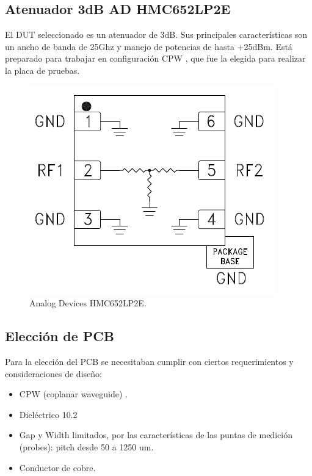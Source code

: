 \documentclass[10pt, a4paper, twocolumn]{article}
\begin{document}

\subsection{Atenuador 3dB AD HMC652LP2E}

El DUT seleccionado es un atenuador de 3dB. Sus principales características son
un ancho de banda de 25Ghz y manejo de potencias de hasta +25dBm. Está preparado
para trabajar en configuración CPW \cite{cpw}, que fue la elegida para realizar la placa de
pruebas.

\begin{figure}[hbt!]
	\includegraphics[width=\linewidth]{Fotos/DUT.png}
	\caption{Analog Devices HMC652LP2E.}
\end{figure}


\subsection{Elección de PCB}

Para la elección del PCB se necesitaban cumplir con ciertos requerimientos y
consideraciones de diseño:
\begin{itemize}
	\item CPW (coplanar waveguide) \cite{cpw}.
	\item Dieléctrico 10.2
	\item Gap y Width limitados, por las características de las puntas de medición (probes): pitch desde 50 a 1250 um.
	\item Conductor de cobre.
\end{itemize}
\end{document}
